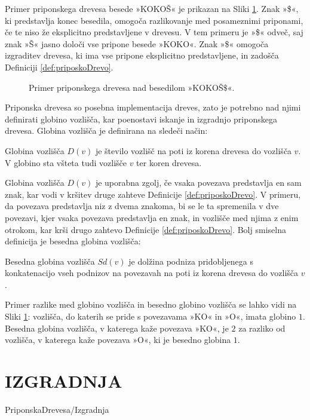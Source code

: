 Primer priponskega drevesa besede »KOKOŠ« je prikazan na Sliki \ref{fig:PriponskoDrevo}. Znak »\$«, ki predstavlja konec besedila, omogoča razlikovanje med posameznimi priponami, če te niso že eksplicitno predstavljene v drevesu. V tem primeru je »\$« odveč, saj znak »Š« jasno določi vse pripone besede »KOKO«. Znak »\$« omogoča izgraditev drevesa, ki ima vse pripone eksplicitno predstavljene, in zadošča Definiciji \ref{def:priposkoDrevo}.

\begin{figure}[tb]
    \begin{center}
        
        \caption{Primer priponskega drevesa nad besedilom »KOKOŠ$\$$«.} 
        \label{fig:PriponskoDrevo}
    \end{center}
\end{figure}

Priponska drevesa so posebna implementacija dreves, zato je potrebno nad njimi definirati globino vozlišča, kar poenostavi iskanje in izgradnjo priponskega drevesa. Globina vozlišča je definirana na sledeči način:

\begin{defi}
   Globina vozlišča $D(v)$ je število vozlišč na poti iz korena drevesa do vozlišča $v$. V globino sta všteta tudi vozlišče $v$ ter koren drevesa.
\end{defi}

Globina vozlišča $D(v)$ je uporabna zgolj, če vsaka povezava predstavlja en sam znak, kar vodi v kršitev druge zahteve Definicije  \ref{def:priposkoDrevo}. V primeru, da povezava predstavlja niz z dvema znakoma, bi se le ta spremenila v dve povezavi, kjer vsaka povezava predstavlja en znak, in vozlišče med njima z enim otrokom, kar krši drugo zahtevo Definicije \ref{def:priposkoDrevo}. Bolj smiselna definicija je besedna globina vozlišča:

\begin{defi}
    Besedna globina vozlišča $Sd(v)$ je dolžina podniza pridobljenega s konkatenacijo vseh podnizov na povezavah na poti iz korena drevesa do vozlišča $v$. 
\end{defi}

Primer razlike med globino vozlišča in besedno globino vozlišča se lahko vidi na Sliki \ref{fig:PriponskoDrevo}: vozlišča, do katerih se pride s povezavama »KO« in »O«, imata globino $1$. Besedna globina vozlišča, v katerega kaže povezava »KO«, je $2$ za razliko od vozlišča, v katerega kaže povezava »O«, ki je besedno globina $1$. 

\section{IZGRADNJA}\label{sec:izgradnja}
{PriponskaDrevesa/Izgradnja}